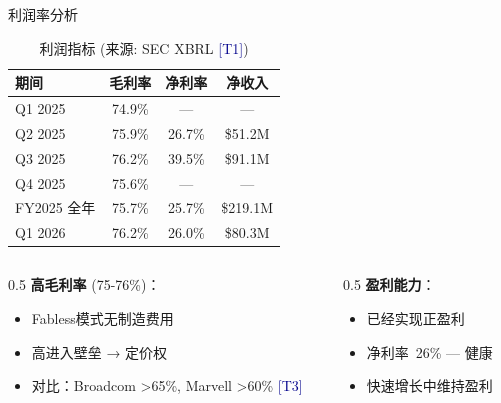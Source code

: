 \documentclass[UTF8,11pt,aspectratio=169]{beamer}
\newcommand{\sourceT}[1]{{\small\textcolor{darkblue}{[T#1]}}}
\begin{document}
\begin{frame}{利润率分析}
    \begin{table}
        \caption{利润指标 (来源: SEC XBRL \sourceT{1})}
        \begin{tabular}{lccc}
            \toprule
            \textbf{期间} & \textbf{毛利率} & \textbf{净利率} & \textbf{净收入} \\
            \midrule
            Q1 2025 & 74.9\% & — & — \\
            Q2 2025 & 75.9\% & 26.7\% & \$51.2M \\
            Q3 2025 & 76.2\% & 39.5\% & \$91.1M \\
            Q4 2025 & 75.6\% & — & — \\
            \rowcolor{blue!5}
            FY2025 全年 & 75.7\% & 25.7\% & \$219.1M \\
            Q1 2026 & 76.2\% & 26.0\% & \$80.3M \\
            \bottomrule
        \end{tabular}
    \end{table}

    \begin{columns}[T]
        \begin{column}{0.5\textwidth}
            \textbf{高毛利率} (75-76\%)：
            \begin{itemize}
                \item Fabless模式无制造费用
                \item 高进入壁垒 → 定价权
                \item 对比：Broadcom >65\%, Marvell >60\% \sourceT{3}
            \end{itemize}
        \end{column}
        \begin{column}{0.5\textwidth}
            \textbf{盈利能力}：
            \begin{itemize}
                \item 已经实现正盈利
                \item 净利率~26\% — 健康
                \item 快速增长中维持盈利
            \end{itemize}
        \end{column}
    \end{columns}
\end{frame}

\end{document}

